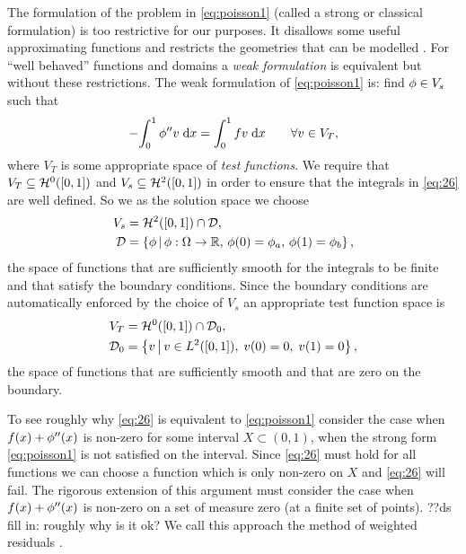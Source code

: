 {The formulation of the problem in \cref{eq:poisson1} (called a strong or classical formulation) is too restrictive for our purposes.
It disallows some useful approximating functions and restricts the geometries that can be modelled \cite[14]{HowardElmanDavidSilvester2006}.
For ``well behaved'' functions and domains a \emph{weak formulation} is equivalent but without these restrictions.
The weak formulation of \cref{eq:poisson1} is: find $\phi\in V_{s}$ such that
\begin{equation}
  -{\int_0^1 \phi'' v {\; \mathrm{{d}}}{x}} = {\int_0^1 f v {\; \mathrm{{d}}}{x}} \qquad \forall v \in V_{T},
  \label{eq:26}
\end{equation}
where $V_{T}$ is some appropriate space of \emph{test functions}.
We require that $V_{T}\subseteq \mathcal{H}^0([0,1])$ and $V_s \subseteq \mathcal{H}^2([0,1])$ in order to ensure that the integrals in \cref{eq:26} are well defined.
So we as the solution space we choose
\begin{equation}
  \begin{aligned}
    V_{s} &= \mathcal{H}^2([0,1]) \cap \mathcal{D}, \\
    \mathcal{D} &= \left\{ {\phi} \,\middle|\, {\phi: \Omega \rightarrow \mathbb{R} ,\, \phi(0) = \phi_{a},\, \phi(1) = \phi_{b}} \right\},
  \end{aligned}
\end{equation}
\ie the space of functions that are sufficiently smooth for the integrals to be finite and that satisfy the boundary conditions.
Since the boundary conditions are automatically enforced by the choice of $V_s$ an appropriate test function space is
\begin{equation}
  \label{eq:28}
  \begin{aligned}
    V_{T} &= \mathcal{H}^0([0,1]) \cap \mathcal{D}_0, \\
    \mathcal{D}_0 &= \left\{ {v} \,\middle|\, {v \in L^2([0,1]),\; v(0) =0,\; v(1)=0} \right\},
  \end{aligned}
\end{equation}
\ie the space of functions that are sufficiently smooth and that are zero on the boundary.

To see roughly why \cref{eq:26} is equivalent to \cref{eq:poisson1} consider the case when $f(x) + \phi''(x)$ is non-zero for some interval $X \subset (0,1)$, \ie when the strong form \cref{eq:poisson1} is not satisfied on the interval.
Since \cref{eq:26} must hold for all functions we can choose a function which is only non-zero on $X$ and \cref{eq:26} will fail.
The rigorous extension of this argument must consider the case when $f(x) + \phi''(x)$ is non-zero on a set of measure zero (\eg at a finite set of points). ??ds fill in: roughly why is it ok?
We call this approach the method of weighted residuals \cite[210, 214]{Zeinkiewicz1967}.

}
